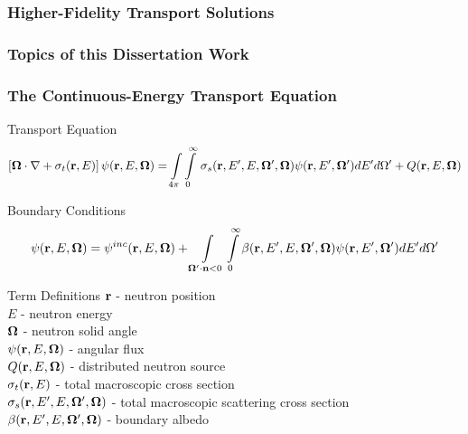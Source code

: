 \documentclass[compress,10pt]{beamer}
\renewcommand{\vec}[1]{\mathbf{#1}}
\begin{document}
\subsection{}
\begin{frame}[t]\frametitle{Higher-Fidelity Transport Solutions}

\end{frame}
\begin{frame}[t]\frametitle{Topics of this Dissertation Work}

\end{frame}
\begin{frame}[t]\frametitle{The Continuous-Energy Transport Equation} \vspace{-2.5mm}
\begin{block}{Transport Equation}{\footnotesize
\begin{equation*}
\left[ { \bf \Omega} \cdot {\bf \nabla}  + \sigma_t ({\bf r}, E) \right] \psi ({\bf r}, E, {\bf \Omega}) = \int\displaylimits_{4 \pi} \int\displaylimits_{0}^{\infty}  \, \sigma_s ({\bf r}, E' , E, {\bf \Omega}' , {\bf \Omega}) \psi ({\bf r}, E', {\bf \Omega}') d E'  d \Omega'+ Q ({\bf r}, E, {\bf \Omega})
\end{equation*}
}\end{block} \vspace{-1.0mm}
\begin{block}{Boundary Conditions}{\footnotesize
\begin{equation*}
\psi ({\bf r}, E, {\bf \Omega}) = \psi^{inc} ({\bf r}, E, {\bf \Omega}) +  \int\displaylimits_{\vec{\Omega}' \cdot \vec{n} < 0} \int\displaylimits_{0}^{\infty} \beta ({\bf r}, E' , E, {\bf \Omega}' , {\bf \Omega}) \psi ({\bf r}, E', {\bf \Omega}') d E'  d \Omega'
\end{equation*}
}\end{block} \vspace{-1.0mm}
\begin{block}{Term Definitions} {\footnotesize
${\bf r}$ -  neutron position \\
$E$ -  neutron energy \\
${\bf \Omega}$ - neutron solid angle \\
$\psi  ({\bf r}, E, {\bf \Omega})$ - angular flux  \\
$Q  ({\bf r}, E, {\bf \Omega})$ - distributed neutron source \\
$\sigma_t ({\bf r}, E)$ - total macroscopic cross section \\
$\sigma_s ({\bf r}, E' , E, {\bf \Omega}' , {\bf \Omega})$ - total macroscopic scattering cross section\\
$\beta ({\bf r}, E' , E, {\bf \Omega}' , {\bf \Omega})$ - boundary albedo 
}\end{block}
\end{frame}
\end{document}
